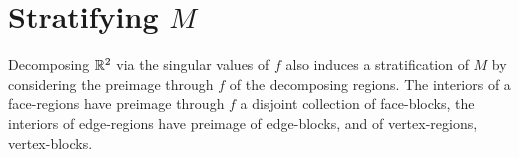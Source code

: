 \section{Stratifying $M$}

Decomposing $\mathbb{R}^2$ via the singular values of $f$ also induces a stratification of $M$ by considering the preimage through $f$ of the decomposing regions.
The interiors of a face-regions have preimage through $f$ a disjoint collection of face-blocks, the interiors of edge-regions have preimage of edge-blocks, and of vertex-regions, vertex-blocks.
